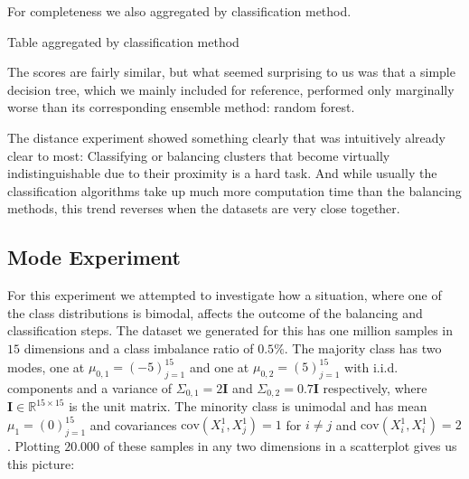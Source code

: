 For completeness we also aggregated by classification method.

\begin{table}[H]
\centering
\caption{Table aggregated by classification method}
\end{table}

The scores are fairly similar, but what seemed surprising to us was that a simple decision tree, which we mainly included for reference, 
performed only marginally worse than its corresponding ensemble method: random forest.

The distance experiment showed something clearly that was intuitively already clear to most:
Classifying or balancing clusters that become virtually indistinguishable due to their proximity is a hard task.
And while usually the classification algorithms take up much more computation time than the balancing methods, 
this trend reverses when the datasets are very close together.


\subsection{Mode Experiment}

For this experiment we attempted to investigate how a situation, where one of the class distributions is bimodal, affects the outcome of the balancing and classification steps.
The dataset we generated for this has one million samples in $15$ dimensions and a class imbalance ratio of $0.5\%$. 
The majority class has two modes, one at $\mu_{0,1} = (-5)_{j=1}^{15}$ and one at $\mu_{0,2} = (5)_{j=1}^{15}$ with i.i.d. components 
and a variance of $\Sigma_{0,1} = 2 \mathbf{I}$ and $\Sigma_{0,2} = 0.7 \mathbf{I}$ respectively, where $\mathbf{I} \in \mathbb{R}^{15 \times 15}$ is the unit matrix.
The minority class is unimodal and has mean $\mu_{1} = (0)_{j=1}^{15}$ and covariances $\text{cov}(X_i^1, X_j^1) = 1$ for $i \neq j$ and $\text{cov}(X_i^1, X_i^1) = 2$.
Plotting $20.000$ of these samples in any two dimensions in a scatterplot gives us this picture:


